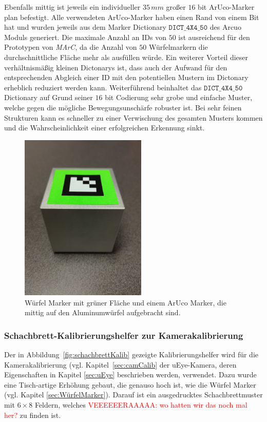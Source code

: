 Ebenfalls mittig ist jeweils ein individueller $35\,mm$ großer $16$ bit ArUco-Marker plan befestigt. Alle verwendeten ArUco-Marker haben einen Rand von einem Bit hat und wurden jeweils aus dem Marker Dictionary $\texttt{DICT\_4X4\_50}$ des Arcuo Moduls \cite{website:ArucoDoc} generiert. Die maximale Anzahl an IDs von $50$ ist ausreichend für den Prototypen von \textit{MArC}, da die Anzahl von $50$ Würfelmarkern die durchschnittliche Fläche mehr als ausfüllen würde. Ein weiterer Vorteil dieser verhältnismäßig kleinen Dictonarys ist, dass auch der Aufwand für den entsprechenden Abgleich einer ID mit den potentiellen Mustern im Dictonary erheblich reduziert werden kann. 
Weiterführend beinhaltet das $\texttt{DICT\_4X4\_50}$ Dictionary auf Grund seiner $16$ bit Codierung sehr grobe und einfache Muster, welche gegen die mögliche Bewegungsunschärfe robuster ist. Bei sehr feinen Strukturen kann es schneller zu einer Verwischung des gesamten Musters kommen und die Wahrscheinlichkeit einer erfolgreichen Erkennung sinkt.
	\begin{figure}[H] 
	\center 
	\includegraphics[trim = 0mm 280mm 0mm 150mm, clip, width=6cm]{Bilder/tracking-marker.jpg}			
	\caption{Würfel Marker mit grüner Fläche und einem ArUco Marker, die mittig auf den Aluminumwürfel aufgebracht sind.}
	\label{fig:marker}
\end{figure}

\subsubsection{Schachbrett-Kalibrierungshelfer zur Kamerakalibrierung} \label{sec:SchachbrettKalib} 
Der in Abbildung~\ref{fig:schachbrettKalib} gezeigte Kalibrierungshelfer wird für die Kamerakalibrierung (vgl. Kapitel~\ref{sec:camCalib} der uEye-Kamera, deren Eigenschaften in Kapitel \ref{sec:uEye} beschrieben werden, verwendet. Dazu wurde eine Tisch-artige Erhöhung gebaut, die genauso hoch ist, wie die Würfel Marker (vgl. Kapitel \ref{sec:WürfelMarker}). Darauf ist ein ausgedrucktes Schachbrettmuster mit $6\times8$ Feldern, welches \textcolor{red}{VEEEEEERAAAAA: wo hatten wir das noch mal her?} zu finden ist.


